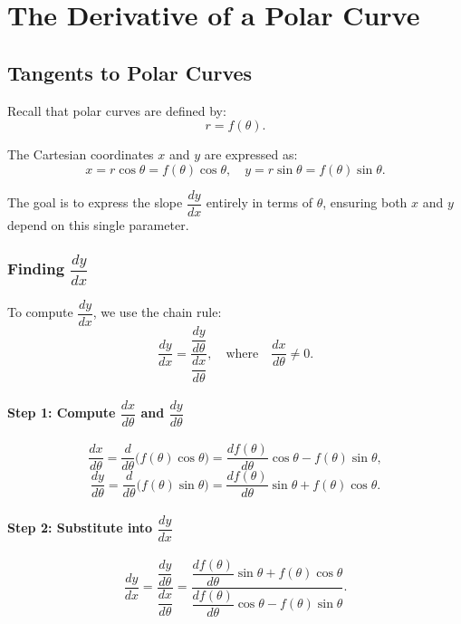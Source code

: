 \documentclass{article}
\begin{document}
\section*{The Derivative of a Polar Curve}
\subsection*{Tangents to Polar Curves}

\begin{definitionbox}
\begin{notebox}
Recall that polar curves are defined by:
\[
    r = f(\theta).
\]
\end{notebox}

The Cartesian coordinates \(x\) and \(y\) are expressed as:
\[
    x = r\cos\theta = f(\theta) \cos\theta, \quad 
    y = r\sin\theta = f(\theta) \sin\theta.
\]

\begin{intuitionbox}
The goal is to express the slope \( \dfrac{dy}{dx} \) entirely in terms of \( \theta \), ensuring both \(x\) and \(y\) depend on this single parameter.
\end{intuitionbox}

\subsubsection*{Finding \( \dfrac{dy}{dx} \)}
To compute \( \dfrac{dy}{dx} \), we use the chain rule:
\[
    \dfrac{dy}{dx} = \dfrac{\dfrac{dy}{d\theta}}{\dfrac{dx}{d\theta}}, \quad \text{where} \quad \dfrac{dx}{d\theta} \neq 0.
\]

\paragraph{Step 1: Compute \( \dfrac{dx}{d\theta} \) and \( \dfrac{dy}{d\theta} \)}
\[
    \dfrac{dx}{d\theta} = \dfrac{d}{d\theta} \big( f(\theta) \cos\theta \big) = \dfrac{df(\theta)}{d\theta} \cos\theta - f(\theta) \sin\theta,
\]
\[
    \dfrac{dy}{d\theta} = \dfrac{d}{d\theta} \big( f(\theta) \sin\theta \big) = \dfrac{df(\theta)}{d\theta} \sin\theta + f(\theta) \cos\theta.
\]

\paragraph{Step 2: Substitute into \( \dfrac{dy}{dx} \)}
\[
    \dfrac{dy}{dx} = \dfrac{\dfrac{dy}{d\theta}}{\dfrac{dx}{d\theta}} = 
    \dfrac{\dfrac{df(\theta)}{d\theta} \sin\theta + f(\theta) \cos\theta}{\dfrac{df(\theta)}{d\theta} \cos\theta - f(\theta) \sin\theta}.
\]


\end{definitionbox}
\end{document}
